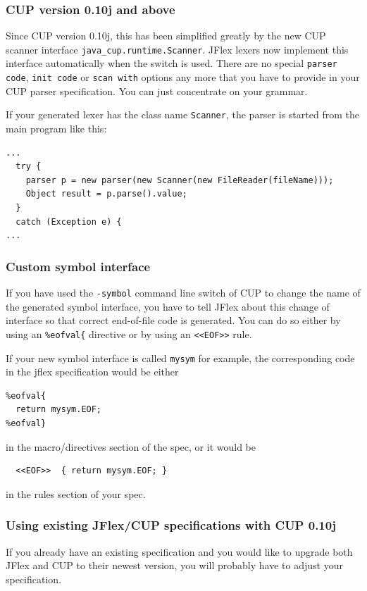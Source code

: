 \documentclass[11pt]{scrartcl}
\newcommand{\xsmall}{\small}
\begin{document}
\subsubsection{CUP version 0.10j and above}
Since CUP version 0.10j, this has been simplified greatly by the new 
CUP scanner interface \texttt{java\_cup.runtime.Scanner}. JFlex lexers now implement
this interface automatically when the \texttt{}
switch is used. There are no special \texttt{parser code}, \texttt{init
  code} or \texttt{scan with} options any more that you have to provide
in your CUP parser specification. You can just concentrate on your grammar.

If your generated lexer has the class name \texttt{Scanner}, the parser
is started from the main program like this:

{\xsmall\begin{verbatim}
...
  try {
    parser p = new parser(new Scanner(new FileReader(fileName)));
    Object result = p.parse().value;
  }
  catch (Exception e) {
...
\end{verbatim}
}

\subsubsection{Custom symbol interface}
If you have used the \texttt{-symbol} command line switch of CUP to change
the name of the generated symbol interface, you have to tell JFlex about
this change of interface so that correct end-of-file code is generated. 
You can do so either by using an \verb+%eofval{+ directive or by using
an \texttt{<<EOF>>} rule. 

If your new symbol interface is called \texttt{mysym} for example, the
corresponding code in the jflex specification would be either

{\xsmall
\begin{verbatim}
%eofval{
  return mysym.EOF;
%eofval}
\end{verbatim}
}

in the macro/directives section of the spec, or it would be

{\xsmall
\begin{verbatim}
  <<EOF>>  { return mysym.EOF; }
\end{verbatim}
}

in the rules section of your spec.

\subsubsection{Using existing JFlex/CUP specifications with CUP 0.10j}
If you already have an existing specification and you would like to upgrade
both JFlex and CUP to their newest version, you will probably have to adjust
your specification.
\end{document}
